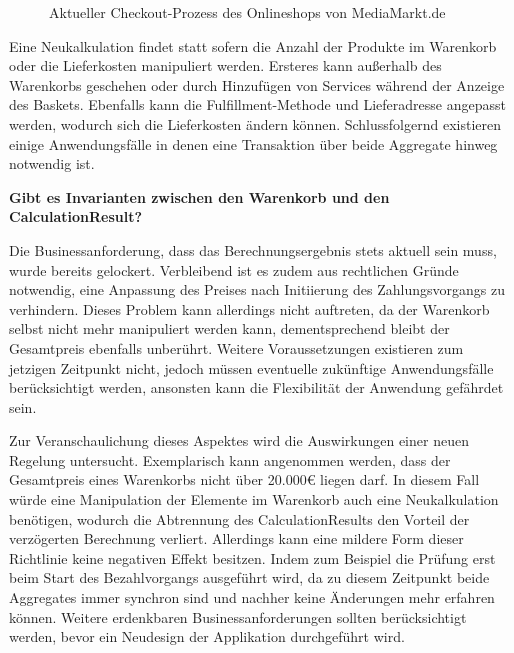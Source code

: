\vspace{0.5cm}
\begin{figure}[htbp]
	\centering
	\caption{Aktueller Checkout-Prozess des Onlineshops von MediaMarkt.de}
	\label{fig:Checkout-Process}
\end{figure}

Eine Neukalkulation findet statt sofern die Anzahl der Produkte im Warenkorb oder die Lieferkosten manipuliert werden. Ersteres kann außerhalb des Warenkorbs geschehen oder durch Hinzufügen von Services während der Anzeige des Baskets. Ebenfalls kann die Fulfillment-Methode und Lieferadresse angepasst werden, wodurch sich die Lieferkosten ändern können. Schlussfolgernd existieren einige Anwendungsfälle in denen eine Transaktion über beide Aggregate hinweg notwendig ist.

\textbf{Gibt es Invarianten zwischen den Warenkorb und den CalculationResult?}

Die Businessanforderung, dass das Berechnungsergebnis stets aktuell sein muss, wurde bereits gelockert. Verbleibend ist es zudem aus rechtlichen Gründe notwendig, eine Anpassung des Preises nach Initiierung des Zahlungsvorgangs zu verhindern. Dieses Problem kann allerdings nicht auftreten, da der Warenkorb selbst nicht mehr manipuliert werden kann, dementsprechend bleibt der Gesamtpreis ebenfalls unberührt. Weitere Voraussetzungen existieren zum jetzigen Zeitpunkt nicht, jedoch müssen eventuelle zukünftige Anwendungsfälle berücksichtigt werden, ansonsten kann die Flexibilität der Anwendung gefährdet sein. 

Zur Veranschaulichung dieses Aspektes wird die Auswirkungen einer neuen Regelung untersucht. Exemplarisch kann angenommen werden, dass der Gesamtpreis eines Warenkorbs nicht über 20.000€ liegen darf. In diesem Fall würde eine Manipulation der Elemente im Warenkorb auch eine Neukalkulation benötigen, wodurch die Abtrennung des CalculationResults den Vorteil der verzögerten Berechnung verliert. Allerdings kann eine mildere Form dieser Richtlinie keine negativen Effekt besitzen. Indem zum Beispiel die Prüfung erst beim Start des Bezahlvorgangs ausgeführt wird, da zu diesem Zeitpunkt beide Aggregates immer synchron sind und nachher keine Änderungen mehr erfahren können. Weitere erdenkbaren Businessanforderungen sollten berücksichtigt werden, bevor ein Neudesign der Applikation durchgeführt wird.

